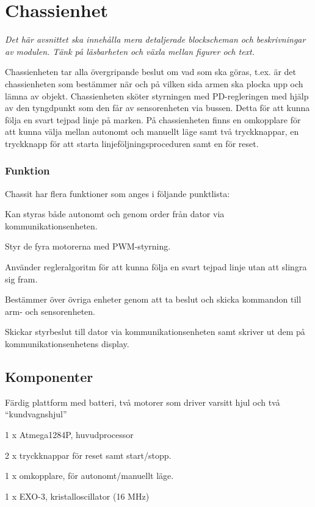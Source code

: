 \section{Chassienhet}
\emph{Det här avsnittet ska innehålla mera detaljerade blockscheman och beskrivningar av modulen.
Tänk på läsbarheten och växla mellan figurer och text.}

Chassienheten tar alla övergripande beslut om vad som ska göras, t.ex. är det chassienheten som bestämmer när och på vilken sida armen ska plocka upp och lämna av objekt. Chassienheten sköter styrningen med PD-regleringen med hjälp av den tyngdpunkt som den får av sensorenheten via bussen. Detta för att kunna följa en svart tejpad linje på marken. På chassienheten finns en omkopplare för att kunna välja mellan autonomt och manuellt läge samt två tryckknappar, en tryckknapp för att starta linjeföljningsproceduren samt en för reset. 

\subsubsection{Funktion}

Chassit har flera funktioner som anges i följande punktlista:
\begin{packed_itemize}
\item Kan styras både autonomt och genom order från dator via kommunikationsenheten.
\item Styr de fyra motorerna med PWM-styrning.
\item Använder regleralgoritm för att kunna följa en svart tejpad linje utan att slingra sig fram.
\item Bestämmer över övriga enheter genom att ta beslut och skicka kommandon till arm- och sensorenheten.
\item Skickar styrbeslut till dator via kommunikationsenheten samt skriver ut dem på kommunikationsenhetens display.
\end{packed_itemize}

\subsection{Komponenter}

\begin{packed_itemize}
\item Färdig plattform med batteri, två motorer som driver varsitt hjul och två “kundvagnshjul”
\item 1 x Atmega1284P, huvudprocessor
\item 2 x tryckknappar för reset samt start/stopp.
\item 1 x omkopplare, för autonomt/manuellt läge.
\item 1 x EXO-3, kristalloscillator (16 MHz)
\end{packed_itemize}

